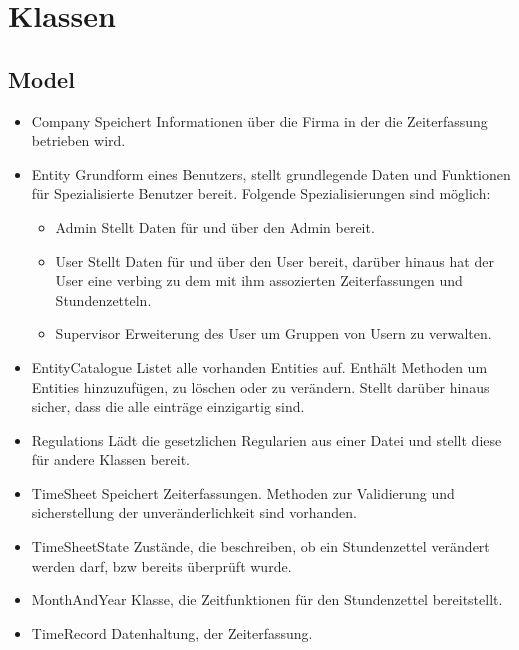\section{Klassen}
    \subsection{Model}
        \begin{itemize}
            \item{Company}
                Speichert Informationen über die Firma in der die Zeiterfassung betrieben wird.
            \item{Entity}
                Grundform eines Benutzers, stellt grundlegende Daten und Funktionen für Spezialisierte Benutzer bereit.
                Folgende Spezialisierungen sind möglich:
                \begin{itemize}
                    \item{Admin}
                        Stellt Daten für und über den Admin bereit.
                    \item{User}
                        Stellt Daten für und über den User bereit, darüber hinaus hat der User eine verbing zu dem mit ihm assozierten Zeiterfassungen und Stundenzetteln.
                    \item{Supervisor}
                        Erweiterung des User um Gruppen von Usern zu verwalten.
                \end{itemize}
            \item{EntityCatalogue}
                Listet alle vorhanden Entities auf. Enthält Methoden um Entities hinzuzufügen, zu löschen oder zu verändern. Stellt darüber hinaus sicher, dass die alle einträge einzigartig sind.
            \item{Regulations}
                Lädt die gesetzlichen Regularien aus einer Datei und stellt diese für andere Klassen bereit.
            \item{TimeSheet}
                Speichert Zeiterfassungen. Methoden zur Validierung und sicherstellung der unveränderlichkeit sind vorhanden.
            \item{TimeSheetState}
                Zustände, die beschreiben, ob ein Stundenzettel verändert werden darf, bzw bereits überprüft wurde.
            \item{MonthAndYear}
                Klasse, die Zeitfunktionen für den Stundenzettel bereitstellt.
            \item{TimeRecord}
                Datenhaltung, der Zeiterfassung.

\end{itemize}
